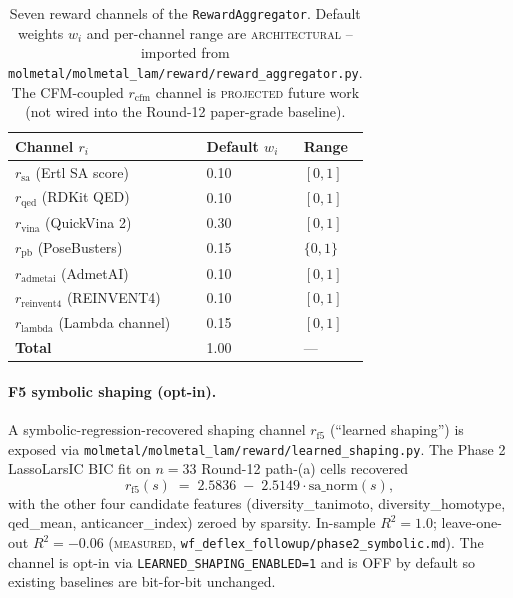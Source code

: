 \begin{table}[h]
  \centering
  \caption{Seven reward channels of the \texttt{RewardAggregator}.
  Default weights $w_i$ and per-channel range are
  \textsc{architectural} -- imported from
  \texttt{molmetal/molmetal\_lam/reward/reward\_aggregator.py}.
  The CFM-coupled $r_{\mathrm{cfm}}$ channel is \textsc{projected}
  future work (not wired into the Round-12 paper-grade
  baseline).}
  \label{tab:reward-aggregator}
  \begin{tabular}{lll}
    \hline
    Channel $r_i$ & Default $w_i$ & Range \\
    \hline
    $r_{\mathrm{sa}}$     (Ertl SA score)      & 0.10 & $[0,1]$ \\
    $r_{\mathrm{qed}}$    (RDKit QED)          & 0.10 & $[0,1]$ \\
    $r_{\mathrm{vina}}$   (QuickVina 2)        & 0.30 & $[0,1]$ \\
    $r_{\mathrm{pb}}$     (PoseBusters)        & 0.15 & $\{0,1\}$ \\
    $r_{\mathrm{admetai}}$ (AdmetAI)           & 0.10 & $[0,1]$ \\
    $r_{\mathrm{reinvent4}}$ (REINVENT4)      & 0.10 & $[0,1]$ \\
    $r_{\mathrm{lambda}}$ (Lambda channel)     & 0.15 & $[0,1]$ \\
    \hline
    \textbf{Total}                              & 1.00 & --- \\
    \hline
  \end{tabular}
\end{table}

\paragraph{F5 symbolic shaping (opt-in).}
A symbolic-regression-recovered shaping channel $r_{\mathrm{f5}}$
(``learned shaping'') is exposed via
\texttt{molmetal/molmetal\_lam/reward/learned\_shaping.py}.
The Phase 2 LassoLarsIC BIC fit on $n=33$ Round-12 path-(a)
cells recovered
\begin{equation}
  \label{eq:f5-shaping}
  r_{\mathrm{f5}}(s) \;=\; 2.5836 \;-\; 2.5149 \cdot \mathrm{sa\_norm}(s),
\end{equation}
with the other four candidate features (diversity\_tanimoto,
diversity\_homotype, qed\_mean, anticancer\_index) zeroed
by sparsity.  In-sample $R^2 = 1.0$; leave-one-out $R^2 = -0.06$
(\textsc{measured}, \texttt{wf\_deflex\_followup/phase2\_symbolic.md}).
The channel is opt-in via
\texttt{LEARNED\_SHAPING\_ENABLED=1} and is OFF by default so
existing baselines are bit-for-bit unchanged.

